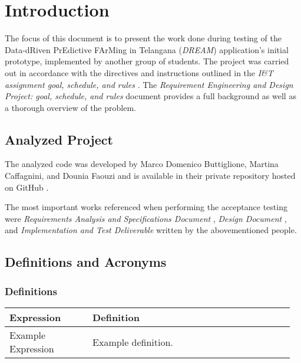 \chapter{Introduction}

The focus of this document is to present the work done during testing of the Data-dRiven PrEdictive FArMing in Telangana (\textit{DREAM}) application's initial prototype, implemented by another group of students. The project was carried out in accordance with the directives and instructions outlined in the \textit{I\&T assignment goal, schedule, and rules} \cite{reference_doc2}. The \textit{Requirement Engineering and Design Project: goal, schedule, and rules} document \cite{reference_doc} provides a full background as well as a thorough overview of the problem.

\section{Analyzed Project}

The analyzed code was developed by Marco Domenico Buttiglione, Martina Caffagnini, and Dounia Faouzi and is available in their private repository hosted on GitHub \cite{dream}.

The most important works referenced when performing the acceptance testing were \textit{Requirements Analysis and Specifications Document} \cite{rasd}, \textit{Design Document} \cite{dd_doc}, and \textit{Implementation and Test Deliverable} \cite{itd_doc} written by the abovementioned people.

\section{Definitions and Acronyms}

\subsection{Definitions}

\begin{center}
    \begin{longtable}{@{}p{0.28\linewidth} p{0.68\linewidth}@{}}
		\toprule
		\textbf{Expression}     & \textbf{Definition}\\
		
		\midrule
        Example Expression      & Example definition.\\
	\bottomrule
	\end{longtable}
\end{center}

